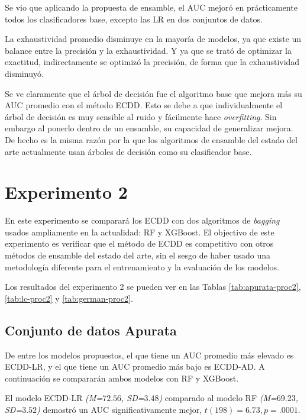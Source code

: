 Se vio que aplicando la propuesta de ensamble, el \ac{AUC} mejoró en prácticamente todos los clasificadores base, excepto las \ac{LR} en dos conjuntos de datos.

La exhaustividad promedio disminuye en la mayoría de modelos, ya que existe un balance entre la precisión y la exhaustividad. Y ya que se trató de optimizar la exactitud, indirectamente se optimizó la precisión, de forma que la exhaustividad disminuyó.

Se ve claramente que el árbol de decisión fue el algoritmo base que mejora más su \ac{AUC} promedio con el método \ac{ECDD}. Esto se debe a que individualmente el árbol de decisión es muy sensible al ruido y fácilmente hace \textit{overfitting}. Sin embargo al ponerlo dentro de un ensamble, su capacidad de generalizar mejora. De hecho es la misma razón por la que los algoritmos de ensamble del estado del arte actualmente usan árboles de decisión como su clasificador base.




\section{Experimento 2} %

En este experimento se comparará los \ac{ECDD} con dos algoritmos de \textit{bagging} usados ampliamente en la actualidad: \ac{RF} y \ac{XGBoost}. El objectivo de este experimento es verificar que el método de \ac{ECDD} es competitivo con otros métodos de ensamble del estado del arte, sin el sesgo de haber usado una metodología diferente para el entrenamiento y la evaluación de los modelos.

Los resultados del experimento 2 se pueden ver en las Tablas \ref{tab:apurata-proc2}, \ref{tab:lc-proc2} y \ref{tab:german-proc2}.

\subsection{Conjunto de datos Apurata}

De entre los modelos propuestos, el que tiene un \ac{AUC} promedio más elevado es ECDD-LR, y el que tiene un \ac{AUC} promedio más bajo es ECDD-AD. A continuación se compararán ambos modelos con \ac{RF} y \ac{XGBoost}.

El modelo ECDD-LR \textit{(M=$72.56$, SD=$3.48$)} comparado al modelo \ac{RF} \textit{(M=$69.23$, SD=$3.52$)} demostró un \ac{AUC} significativamente mejor, $t(198)=6.73, p=.0001$.

